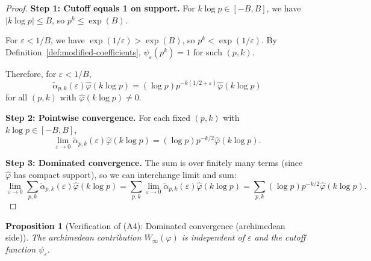 ﻿\documentclass[12pt,a4paper]{article}
\newtheorem{proposition}[theorem]{Proposition}
\theoremstyle{definition}
\theoremstyle{remark}
\begin{document}
\begin{proof}
\textbf{Step 1: Cutoff equals 1 on support.}
For $k \log p \in [-B, B]$, we have $|k \log p| \leq B$, so $p^k \leq \exp(B)$.

For $\varepsilon < 1/B$, we have $\exp(1/\varepsilon) > \exp(B)$, so $p^k < \exp(1/\varepsilon)$. By Definition~\ref{def:modified-coefficients}, $\psi_\varepsilon(p^k) = 1$ for such $(p,k)$.

Therefore, for $\varepsilon < 1/B$,
\[
  \widetilde{\alpha}_{p,k}(\varepsilon) \widehat{\varphi}(k\log p) = (\log p) p^{-k(1/2+\varepsilon)} \widehat{\varphi}(k\log p)
\]
for all $(p,k)$ with $\widehat{\varphi}(k\log p) \neq 0$.

\textbf{Step 2: Pointwise convergence.}
For each fixed $(p,k)$ with $k \log p \in [-B, B]$,
\[
  \lim_{\varepsilon \to 0} \widetilde{\alpha}_{p,k}(\varepsilon) \widehat{\varphi}(k\log p) = (\log p) p^{-k/2} \widehat{\varphi}(k\log p).
\]

\textbf{Step 3: Dominated convergence.}
The sum is over finitely many terms (since $\widehat{\varphi}$ has compact support), so we can interchange limit and sum:
\[
  \lim_{\varepsilon \to 0} \sum_{p,k} \widetilde{\alpha}_{p,k}(\varepsilon) \widehat{\varphi}(k\log p) = \sum_{p,k} \lim_{\varepsilon \to 0} \widetilde{\alpha}_{p,k}(\varepsilon) \widehat{\varphi}(k\log p) = \sum_{p,k} (\log p) p^{-k/2} \widehat{\varphi}(k\log p).
\]
\end{proof}

\begin{proposition}[Verification of (A4): Dominated convergence (archimedean side)]\label{prop:verify-A4}
The archimedean contribution $W_\infty(\varphi)$ is independent of $\varepsilon$ and the cutoff function $\psi_\varepsilon$.
\end{proposition}
\end{document}

